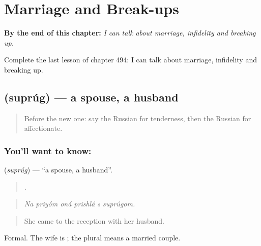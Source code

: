 
\chapter{Marriage and Break-ups}
\label{ch:ru-marriage-and-break-ups}

\begin{chapteropening}
\textbf{By the end of this chapter:} \emph{I can talk about marriage, infidelity and breaking up.}

Complete the last lesson of chapter 494: I can talk about marriage, infidelity and breaking up.
\end{chapteropening}

\section[\texorpdfstring{\ru{супруг} (suprúg)}{супруг (suprúg)}]{ (suprúg) — a spouse, a husband}

\label{lesson:RU-C494-suprug}



\begin{quote}
Before the new one: say the Russian for tenderness, then the Russian for affectionate.
\end{quote}

\subsection*{You'll want to know: }
\textbf{} (\emph{suprúg}) — \textquotedblleft{}a spouse, a husband\textquotedblright{}.

\begin{quote}
     .
\end{quote}

\begin{quote}
\emph{Na priyóm oná prishlá s suprúgom.}
\end{quote}

\begin{quote}
She came to the reception with her husband.
\end{quote}

Formal. The wife is \emph{}; the plural \emph{} means a married couple.

